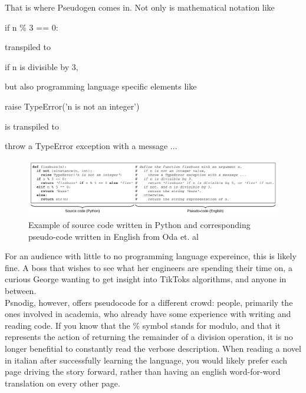 That is where Pseudogen comes in. Not only is mathematical notation like

\begin{displayquote}
    if n \% 3 == 0:
\end{displayquote}

transpiled to

\begin{displayquote}
    if n is divisible by 3,
\end{displayquote}

but also programming language specific elements like

\begin{displayquote}
    raise TypeError('n is not an integer')
\end{displayquote}

is transpiled to

\begin{displayquote}
    throw a TypeError exception with a message ...
\end{displayquote}

\begin{figure}[ht]
    \centering
    \includegraphics[scale=0.52]{assets/odaetal.png}
    \caption{Example of source code written in Python and corresponding pseudo-code written in English from Oda et. al}
    \label{fig:enter-label}
\end{figure}

For an audience with little to no programming language expereince, this is likely fine. A boss that wishes to see what her engineers are spending their time on, a curious George wanting to get insight into TikToks algorithms, and anyone in between. \hfill \\

Psnodig, however, offers pseudocode for a different crowd: people, primarily the ones involved in academia, who already have some experience with writing and reading code. If you know that the \% symbol stands for modulo, and that it represents the action of returning the remainder of a division operation, it is no longer benefitial to constantly read the verbose description. When reading a novel in italian after successfully learning the language, you would likely prefer each page driving the story forward, rather than having an english word-for-word translation on every other page. \hfill \\


